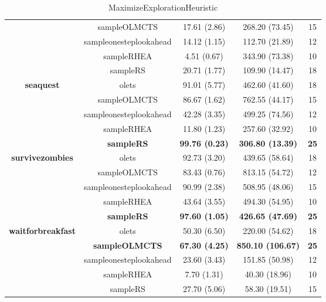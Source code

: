 \begin{table*}[!t]
\begin{center}
\begin{adjustbox}{width=1\textwidth}
\begin{tabular}{|c|c|c|c|c|}
 \\
\cline{2-5}
 & sampleOLMCTS & 17.61 (2.86) & 268.20 (73.45) & 15
 \\
\cline{2-5}
 & sampleonesteplookahead & 14.12 (1.15) & 112.70 (21.89) & 12
 \\
\cline{2-5}
 & sampleRHEA & 4.51 (0.67) & 343.90 (73.38) & 10
 \\
\cline{2-5}
 & sampleRS & 20.71 (1.77) & 109.90 (14.47) & 18
 \\
\hline
\hline
\cline{2-5}
\multirow{5}{*}{\textbf{seaquest}} & olets & 91.01 (5.77) & 462.60 (41.60) & 18
 \\
\cline{2-5}
 & sampleOLMCTS & 86.67 (1.62) & 762.55 (44.17) & 15
 \\
\cline{2-5}
 & sampleonesteplookahead & 42.28 (3.35) & 499.25 (74.56) & 12
 \\
\cline{2-5}
 & sampleRHEA & 11.80 (1.23) & 257.60 (32.92) & 10
 \\
\cline{2-5}
 & \textbf{sampleRS} & \textbf{99.76 (0.23)} & \textbf{306.80 (13.39)} & \textbf{25}
 \\
\hline
\hline
\cline{2-5}
\multirow{5}{*}{\textbf{survivezombies}} & olets & 92.73 (3.20) & 439.65 (58.64) & 18
 \\
\cline{2-5}
 & sampleOLMCTS & 83.43 (0.76) & 813.15 (54.72) & 12
 \\
\cline{2-5}
 & sampleonesteplookahead & 90.99 (2.38) & 508.95 (48.06) & 15
 \\
\cline{2-5}
 & sampleRHEA & 43.64 (3.55) & 494.30 (54.95) & 10
 \\
\cline{2-5}
 & \textbf{sampleRS} & \textbf{97.60 (1.05)} & \textbf{426.65 (47.69)} & \textbf{25}
 \\
\hline
\hline
\cline{2-5}
\multirow{5}{*}{\textbf{waitforbreakfast}} & olets & 50.30 (6.50) & 220.00 (54.62) & 18
 \\
\cline{2-5}
 & \textbf{sampleOLMCTS} & \textbf{67.30 (4.25)} & \textbf{850.10 (106.67)} & \textbf{25}
 \\
\cline{2-5}
 & sampleonesteplookahead & 23.60 (3.43) & 151.85 (50.98) & 12
 \\
\cline{2-5}
 & sampleRHEA & 7.70 (1.31) & 40.30 (18.96) & 10
 \\
\cline{2-5}
 & sampleRS & 27.70 (5.06) & 58.30 (19.51) & 15
 \\
\hline
\hline
\hline
\end{tabular}
\end{adjustbox}
\caption{MaximizeExplorationHeuristic}
\label{tab:weights}
\end{center}
\end{table*}
